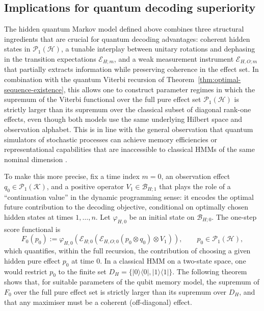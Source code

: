 \documentclass[12pt, reco]{article}
\begin{document}
\subsection{Implications for quantum decoding superiority}

The hidden quantum Markov model defined above combines three structural ingredients that are crucial for quantum decoding advantages: coherent hidden states in \(\mathcal{P}_1(\mathcal{H})\), a tunable interplay between unitary rotations and dephasing in the transition expectations \(\mathcal{E}_{H;m}\), and a weak measurement instrument \(\mathcal{E}_{H,O;m}\) that partially extracts information while preserving coherence in the effect set. In combination with the quantum Viterbi recursion of Theorem~\ref{thm:optimal-sequence-existence}, this allows one to construct parameter regimes in which the supremum of the Viterbi functional over the full pure effect set \(\mathcal{P}_1(\mathcal{H})\) is strictly larger than its supremum over the classical subset of diagonal rank-one effects, even though both models use the same underlying Hilbert space and observation alphabet. This is in line with the general observation that quantum simulators of stochastic processes can achieve memory efficiencies or representational capabilities that are inaccessible to classical HMMs of the same nominal dimension \cite{Elliot21,Banchi24,ElliotiGu24,YangElliot25,Lu95,AGLS24Q}.

To make this more precise, fix a time index \(m=0\), an observation effect \(q_0 \in \mathcal{P}_1(\mathcal{K})\), and a positive operator \(V_1 \in \mathcal{B}_{H;1}\) that plays the role of a “continuation value” in the dynamic programming sense: it encodes the optimal future contribution to the decoding objective, conditional on optimally chosen hidden states at times \(1,\dots,n\). Let \(\varphi_{H,0}\) be an initial state on \(\mathcal{B}_{H;0}\). The one-step score functional is
\begin{equation}
\label{eq:one-step-functional}
F_0(p_0)
:=
\varphi_{H,0}\!\left(
\mathcal{E}_{H;0}\!\left(
\mathcal{E}_{H,O;0}(p_0\otimes q_0)\otimes V_1
\right)\right),
\qquad
p_0 \in \mathcal{P}_1(\mathcal{H}),
\end{equation}
which quantifies, within the full recursion, the contribution of choosing a given hidden pure effect \(p_0\) at time \(0\). In a classical HMM on a two-state space, one would restrict \(p_0\) to the finite set \(D_H = \{|0\rangle\langle0|,|1\rangle\langle1|\}\). The following theorem shows that, for suitable parameters of the qubit memory model, the supremum of \(F_0\) over the full pure effect set is strictly larger than its supremum over \(D_H\), and that any maximiser must be a coherent (off-diagonal) effect.
\end{document}
